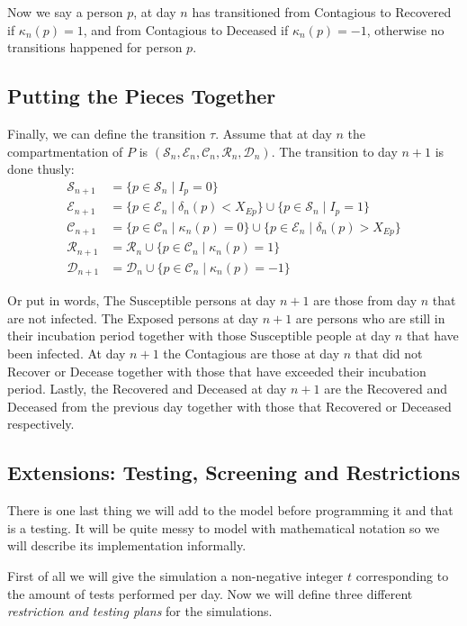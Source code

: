 \documentclass{article}
\newcommand*{\mcs}{\mathcal{S}}
\newcommand*{\mce}{\mathcal{E}}
\newcommand*{\mcc}{\mathcal{C}}
\newcommand*{\mcr}{\mathcal{R}}
\newcommand*{\mcd}{\mathcal{D}}
\begin{document}
Now we say a person \(p\), at day \(n\) has transitioned from Contagious to Recovered if \(\kappa_n(p) = 1\), and from Contagious to Deceased if \(\kappa_n(p) = -1\), otherwise no transitions happened for person \(p\).

\subsection{Putting the Pieces Together}
Finally, we can define the transition \(\tau\). Assume that at day \(n\) the compartmentation of \(P\) is  \((\mcs_n, \mce_n, \mcc_n, \mcr_n, \mcd_n)\). The transition to day \(n+1\) is done thusly:
\begin{align*}
    \mcs_{n+1} &= \{p \in \mcs_n  \mid I_p = 0\} \\
    \mce_{n+1} &= \{p \in \mce_n  \mid \delta_n(p) < X_{Ep} \} \cup \{p \in \mcs_n \mid I_p = 1\} \\
    \mcc_{n+1} &= \{p \in \mcc_n  \mid \kappa_n(p) = 0\} \cup \{p \in \mce_n  \mid \delta_n(p) > X_{Ep}\} \\
    \mcr_{n+1} &= \mcr_n \cup \{p \in \mcc_n  \mid \kappa_n(p) = 1\} \\
    \mcd_{n+1} &= \mcd_n \cup \{p \in \mcc_n  \mid \kappa_n(p) = -1\}
\end{align*}

Or put in words, The Susceptible persons at day \(n+1\) are those from day \(n\) that are not infected. The Exposed persons at day \(n+1\) are persons who are still in their incubation period together with those Susceptible people at day \(n\) that have been infected. At day \(n+1\) the Contagious are those at day \(n\) that did not Recover or Decease together with those that have exceeded their incubation period. Lastly, the Recovered and Deceased at day \(n+1\) are the Recovered and Deceased from the previous day together with those that Recovered or Deceased respectively.

\subsection{Extensions: Testing, Screening and Restrictions}\label{sec:testing}
There is one last thing we will add to the model before programming it and that is a testing. It will be quite messy to model with mathematical notation so we will describe its implementation informally.

First of all we will give the simulation a non-negative integer \(t\) corresponding to the amount of tests performed per day. Now we will define three different \emph{restriction and testing plans} for the simulations.\
\end{document}
